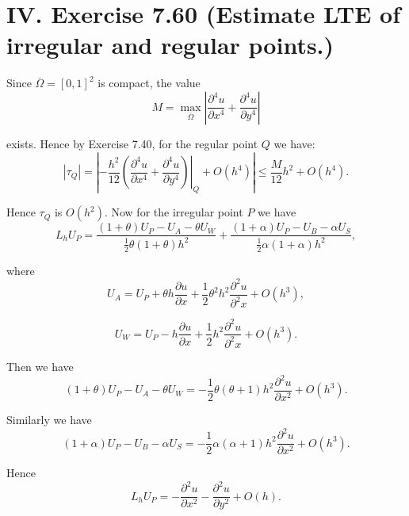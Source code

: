 \documentclass[twoside,a4paper]{article}
\begin{document}
\section*{IV. Exercise 7.60 (Estimate LTE of irregular and regular points.)}

\;\;\;\; Since $\overline{\Omega}=[0,1]^2$ is compact, the value
\begin{equation*}
	M=\max_{\overline{\Omega}} \left|\frac{\partial^4 u}{\partial x^4}+\frac{\partial^4 u}{\partial y^4}\right|
\end{equation*}

exists. Hence by Exercise 7.40, for the regular point $Q$ we have:
\begin{equation*}
	|\tau_Q|=\left|-\frac{h^2}{12}\left.\left(\frac{\partial^4 u}{\partial x^4}+\frac{\partial^4 u}{\partial y^4}\right)\right|_Q+O(h^4)\right| \leq \frac{M}{12}h^2+O(h^4).
\end{equation*}

Hence $\tau_Q$ is $O(h^2)$. Now for the irregular point $P$ we have
\begin{equation*}
	L_hU_P=\frac{(1+\theta)U_P-U_A-\theta U_W}{\frac{1}{2}\theta(1+\theta)h^2}+\frac{(1+\alpha)U_P-U_B-\alpha U_S}{\frac{1}{2}\alpha(1+\alpha)h^2},
\end{equation*}

where
\begin{equation*}
U_A=U_P+\theta h\frac{\partial u}{\partial x}+\frac{1}{2}\theta^2h^2\frac{\partial^2 u}{\partial^2 x} + O(h^3),
\end{equation*}

\begin{equation*}
U_W=U_P-h\frac{\partial u}{\partial x}+\frac{1}{2}h^2\frac{\partial^2 u}{\partial^2 x} + O(h^3).
\end{equation*}

Then we have
\begin{equation*}
	(1+\theta)U_P-U_A-\theta U_W = -\frac{1}{2}\theta(\theta+1)h^2\frac{\partial^2 u}{\partial x^2} + O(h^3).
\end{equation*}

Similarly we have
\begin{equation*}
	(1+\alpha)U_P-U_B-\alpha U_S = -\frac{1}{2}\alpha(\alpha+1)h^2\frac{\partial^2 u}{\partial x^2} + O(h^3).
\end{equation*}

Hence
\begin{equation*}
	L_hU_P=-\frac{\partial^2 u}{\partial x^2}-\frac{\partial^2 u}{\partial y^2}+O(h).
\end{equation*}
\end{document}
